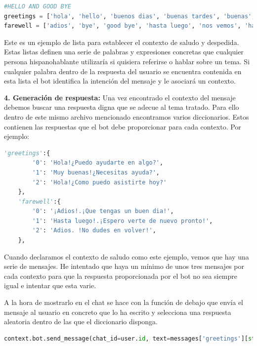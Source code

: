 \begin{lstlisting}[language=Python]
#HELLO AND GOOD BYE
greetings = ['hola', 'hello', 'buenos dias', 'buenas tardes', 'buenas', 'saludos', 'hi', 'good']
farewell = ['adios', 'bye', 'good bye', 'hasta luego', 'nos vemos', 'hasta pronto', 'buenas noches', 'que tengas un buen dia', 'hasta la proxima','que vaya bien']

\end{lstlisting}

Este es un ejemplo de lista para establecer el contexto de saludo y despedida. Estas listas definen una serie de palabras y expresiones concretas que cualquier persona hispanohablante utilizaría si quisiera referirse o hablar sobre un tema. Si cualquier palabra dentro de la respuesta del usuario se encuentra contenida en esta lista el bot identifica la intención del mensaje y le asociará un contexto.\vspace{0.3cm}

\textbf{4. Generación de respuesta: }Una vez encontrado el contexto del mensaje debemos buscar una respuesta digna que se adecue al tema tratado. Para ello dentro de este mismo archivo mencionado encontramos varios diccionarios. Estos contienen las respuestas que el bot debe proporcionar para cada contexto. Por ejemplo:

\begin{lstlisting}[language=Python]
    'greetings':{
        '0': 'Hola!¿Puedo ayudarte en algo?',
        '1': 'Muy buenas!¿Necesitas ayuda?',
        '2': 'Hola!¿Como puedo asistirte hoy?'
    },
    'farewell':{
        '0': '¡Adios!.¡Que tengas un buen dia!',
        '1': 'Hasta luego!.¡Espero verte de nuevo pronto!',
        '2': 'Adios. !No dudes en volver!',
    },
\end{lstlisting}

Cuando declaramos el contexto de saludo como este ejemplo, vemos que hay una serie de mensajes. He intentado que haya un mínimo de unos tres mensajes por cada contexto para que la respuesta proporcionada por el bot no sea siempre igual e intentar que esta varie. \vspace{0.1cm}

A la hora de mostrarlo en el chat se hace con la función de debajo que envía el mensaje al usuario en concreto que lo ha escrito y selecciona una respuesta aleatoria dentro de las que el diccionario disponga.\vspace{0.3cm}

\begin{lstlisting}[language=Python]
context.bot.send_message(chat_id=user.id, text=messages['greetings'][str(random_var)])
\end{lstlisting}

